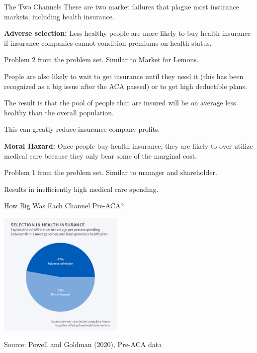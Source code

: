 \documentclass[aspectratio=169]{beamer}
\newenvironment{wideitemize}{\itemize\addtolength{\itemsep}{10pt}}{\enditemize}
\begin{document}
\begin{frame}{The Two Channels}
There are two market failures that plague most insurance markets, including health insurance.
    \begin{wideitemize}
        \item \textbf{Adverse selection:} Less healthy people are more likely to buy health insurance if insurance companies cannot condition premiums on health status.
        \begin{wideitemize}
            \item Problem 2 from the problem set. Similar to Market for Lemons.
            \item People are also likely to wait to get insurance until they need it (this has been recognized as a big issue after the ACA passed) or to get high deductible plans.
            \item The result is that the pool of people that are insured will be on average less healthy than the overall population.
            \item This can greatly reduce insurance company profits.
        \end{wideitemize}
        \item \textbf{Moral Hazard:} Once people buy health insurance, they are likely to over utilize medical care because they only bear some of the marginal cost.
        \begin{wideitemize}
            \item Problem 1 from the problem set. Similar to manager and shareholder.
            \item Results in inefficiently high medical care spending.
        \end{wideitemize}
    \end{wideitemize}
\end{frame}

\begin{frame}{How Big Was Each Channel Pre-ACA?}

\centering

\includegraphics[width=0.45\textwidth]{health.jpg}

Source: Powell and Goldman (2020), Pre-ACA data
    
\end{frame}
\end{document}

